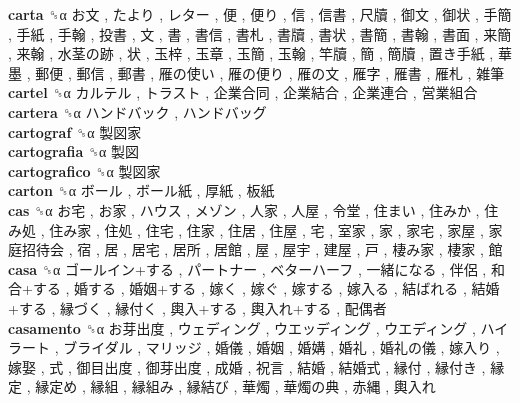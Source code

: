 \textbf{carta} ␝α   お文 ,  たより ,  レター ,  便 ,  便り ,  信 ,  信書 ,  尺牘 ,  御文 ,  御状 ,  手簡 ,  手紙 ,  手翰 ,  投書 ,  文 ,  書 ,  書信 ,  書札 ,  書牘 ,  書状 ,  書簡 ,  書翰 ,  書面 ,  来簡 ,  来翰 ,  水茎の跡 ,  状 ,  玉梓 ,  玉章 ,  玉簡 ,  玉翰 ,  竿牘 ,  簡 ,  簡牘 ,  置き手紙 ,  華墨 ,  郵便 ,  郵信 ,  郵書 ,  雁の使い ,  雁の便り ,  雁の文 ,  雁字 ,  雁書 ,  雁札 ,  雑筆   \\
\textbf{cartel} ␝α   カルテル ,  トラスト ,  企業合同 ,  企業結合 ,  企業連合 ,  営業組合   \\
\textbf{cartera} ␝α   ハンドバック ,  ハンドバッグ   \\
\textbf{cartograf} ␝α   製図家   \\
\textbf{cartografia} ␝α   製図   \\
\textbf{cartografico} ␝α   製図家   \\
\textbf{carton} ␝α   ボール ,  ボール紙 ,  厚紙 ,  板紙   \\
\textbf{cas} ␝α   お宅 ,  お家 ,  ハウス ,  メゾン ,  人家 ,  人屋 ,  令堂 ,  住まい ,  住みか ,  住み処 ,  住み家 ,  住処 ,  住宅 ,  住家 ,  住居 ,  住屋 ,  宅 ,  室家 ,  家 ,  家宅 ,  家屋 ,  家庭招待会 ,  宿 ,  居 ,  居宅 ,  居所 ,  居館 ,  屋 ,  屋宇 ,  建屋 ,  戸 ,  棲み家 ,  棲家 ,  館   \\
\textbf{casa} ␝α   ゴールイン+する ,  パートナー ,  ベターハーフ ,  一緒になる ,  伴侶 ,  和合+する ,  婚する ,  婚姻+する ,  嫁く ,  嫁ぐ ,  嫁する ,  嫁入る ,  結ばれる ,  結婚+する ,  縁づく ,  縁付く ,  輿入+する ,  輿入れ+する ,  配偶者   \\
\textbf{casamento} ␝α   お芽出度 ,  ウェディング ,  ウエッディング ,  ウエディング ,  ハイラート ,  ブライダル ,  マリッジ ,  婚儀 ,  婚姻 ,  婚媾 ,  婚礼 ,  婚礼の儀 ,  嫁入り ,  嫁娶 ,  式 ,  御目出度 ,  御芽出度 ,  成婚 ,  祝言 ,  結婚 ,  結婚式 ,  縁付 ,  縁付き ,  縁定 ,  縁定め ,  縁組 ,  縁組み ,  縁結び ,  華燭 ,  華燭の典 ,  赤縄 ,  輿入れ   \\

